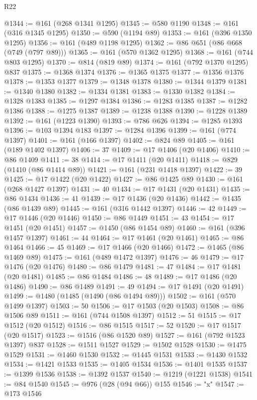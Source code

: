 \begin{lexlean}{R22}
\begin{coremodule}
{{{{{{{{{{{{{{{{{{{{{{{{{{{{{{{{{{{{{{{{{{{{{{{{{{{{@1344 := @161 (@268 @1341 @1295)
@1345 := @580 @1190
@1348 := @161 (@316 @1345 @1295)
@1350 := @590 (@1194 @89)
@1353 := @161 (@396 @1350 @1295)
@1356 := @161 (@489 @1198 @1295)
@1362 := @86 @651 (@86 @668 (@749 (@797 @89)))
@1365 := @161 (@570 @1362 @1295)
@1368 := @161 (@744 @803 @1295)
@1370 := @814 (@819 @89)
@1374 := @161 (@792 @1370 @1295) @837
@1375 := @1368 @1374
@1376 := @1365 @1375
@1377 := @1356 @1376
@1378 := @1353 @1377
@1379 := @1348 @1378
@1380 := @1344 @1379
@1381 := @1340 @1380
@1382 := @1334 @1381
@1383 := @1330 @1382
@1384 := @1328 @1383
@1385 := @1297 @1384
@1386 := @1283 @1385
@1387 := @1282 @1386
@1388 := @1275 @1387
@1389 := @1238 @1388
@1390 := @1228 @1389
@1392 := @161 (@1223 @1390)
@1393 := @786 @626
@1394 := @1285 @1393
@1396 := @103 @1394 @183
@1397 := @1284 @1396
@1399 := @161 (@774 @1397)
@1401 := @161 (@166 @1397)
@1402 := @824 @89
@1405 := @161 (@189 @1402 @1397)
@1406 := 37
@1409 := @17 @1406 (@20 @1406)
@1410 := @86 @1409
@1411 := 38
@1414 := @17 @1411 (@20 @1411)
@1418 := @829 (@1410 (@86 @1414 @89))
@1421 := @161 (@231 @1418 @1397)
@1422 := 39
@1425 := @17 @1422 (@20 @1422)
@1427 := @86 @1425 @89
@1430 := @161 (@268 @1427 @1397)
@1431 := 40
@1434 := @17 @1431 (@20 @1431)
@1435 := @86 @1434
@1436 := 41
@1439 := @17 @1436 (@20 @1436)
@1442 := @1435 (@86 @1439 @89)
@1445 := @161 (@316 @1442 @1397)
@1446 := 42
@1449 := @17 @1446 (@20 @1446)
@1450 := @86 @1449
@1451 := 43
@1454 := @17 @1451 (@20 @1451)
@1457 := @1450 (@86 @1454 @89)
@1460 := @161 (@396 @1457 @1397)
@1461 := 44
@1464 := @17 @1461 (@20 @1461)
@1465 := @86 @1464
@1466 := 45
@1469 := @17 @1466 (@20 @1466)
@1472 := @1465 (@86 @1469 @89)
@1475 := @161 (@489 @1472 @1397)
@1476 := 46
@1479 := @17 @1476 (@20 @1476)
@1480 := @86 @1479
@1481 := 47
@1484 := @17 @1481 (@20 @1481)
@1485 := @86 @1484
@1486 := 48
@1489 := @17 @1486 (@20 @1486)
@1490 := @86 @1489
@1491 := 49
@1494 := @17 @1491 (@20 @1491)
@1499 := @1480 (@1485 (@1490 (@86 @1494 @89)))
@1502 := @161 (@570 @1499 @1397)
@1503 := 50
@1506 := @17 @1503 (@20 @1503)
@1508 := @86 @1506 @89
@1511 := @161 (@744 @1508 @1397)
@1512 := 51
@1515 := @17 @1512 (@20 @1512)
@1516 := @86 @1515
@1517 := 52
@1520 := @17 @1517 (@20 @1517)
@1523 := @1516 (@86 @1520 @89)
@1527 := @161 (@792 @1523 @1397) @837
@1528 := @1511 @1527
@1529 := @1502 @1528
@1530 := @1475 @1529
@1531 := @1460 @1530
@1532 := @1445 @1531
@1533 := @1430 @1532
@1534 := @1421 @1533
@1535 := @1405 @1534
@1536 := @1401 @1535
@1537 := @1399 @1536
@1538 := @1392 @1537
@1540 := @1219 (@1221 @1538)
@1541 := @84 @1540
@1545 := @976 (@28 (@94 @66)) @155
@1546 := "x"
@1547 := @173 @1546
}}}}}}}}}}}}}}}}}}}}}}}}}}}}}}}}}}}}}}}}}}}}}}}}}}}}
\end{coremodule}
\end{lexlean}
